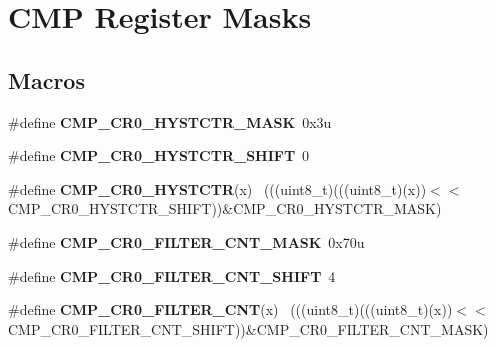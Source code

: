 \hypertarget{group___c_m_p___register___masks}{}\section{C\+M\+P Register Masks}
\label{group___c_m_p___register___masks}
\subsection*{Macros}
\begin{DoxyCompactItemize}
\item 
\hypertarget{group___c_m_p___register___masks_ga9a81a95d8ceda15abb107f3c961e2f03}{}\#define {\bfseries C\+M\+P\+\_\+\+C\+R0\+\_\+\+H\+Y\+S\+T\+C\+T\+R\+\_\+\+M\+A\+S\+K}~0x3u\label{group___c_m_p___register___masks_ga9a81a95d8ceda15abb107f3c961e2f03}

\item 
\hypertarget{group___c_m_p___register___masks_ga12a965eae39b79d9e6066de9af418df3}{}\#define {\bfseries C\+M\+P\+\_\+\+C\+R0\+\_\+\+H\+Y\+S\+T\+C\+T\+R\+\_\+\+S\+H\+I\+F\+T}~0\label{group___c_m_p___register___masks_ga12a965eae39b79d9e6066de9af418df3}

\item 
\hypertarget{group___c_m_p___register___masks_ga3ac2621a332671b38fa231e1fa14d26d}{}\#define {\bfseries C\+M\+P\+\_\+\+C\+R0\+\_\+\+H\+Y\+S\+T\+C\+T\+R}(x)                                          ~(((uint8\+\_\+t)(((uint8\+\_\+t)(x))$<$$<$C\+M\+P\+\_\+\+C\+R0\+\_\+\+H\+Y\+S\+T\+C\+T\+R\+\_\+\+S\+H\+I\+F\+T))\&C\+M\+P\+\_\+\+C\+R0\+\_\+\+H\+Y\+S\+T\+C\+T\+R\+\_\+\+M\+A\+S\+K)\label{group___c_m_p___register___masks_ga3ac2621a332671b38fa231e1fa14d26d}

\item 
\hypertarget{group___c_m_p___register___masks_gab1e98c122818fe880217f72fab932ac2}{}\#define {\bfseries C\+M\+P\+\_\+\+C\+R0\+\_\+\+F\+I\+L\+T\+E\+R\+\_\+\+C\+N\+T\+\_\+\+M\+A\+S\+K}~0x70u\label{group___c_m_p___register___masks_gab1e98c122818fe880217f72fab932ac2}

\item 
\hypertarget{group___c_m_p___register___masks_ga07a4d57ab7d44b55b3d73f612aa7dd98}{}\#define {\bfseries C\+M\+P\+\_\+\+C\+R0\+\_\+\+F\+I\+L\+T\+E\+R\+\_\+\+C\+N\+T\+\_\+\+S\+H\+I\+F\+T}~4\label{group___c_m_p___register___masks_ga07a4d57ab7d44b55b3d73f612aa7dd98}

\item 
\hypertarget{group___c_m_p___register___masks_gad9cbe394311ddbb43945fcdade409c9e}{}\#define {\bfseries C\+M\+P\+\_\+\+C\+R0\+\_\+\+F\+I\+L\+T\+E\+R\+\_\+\+C\+N\+T}(x)                                    ~(((uint8\+\_\+t)(((uint8\+\_\+t)(x))$<$$<$C\+M\+P\+\_\+\+C\+R0\+\_\+\+F\+I\+L\+T\+E\+R\+\_\+\+C\+N\+T\+\_\+\+S\+H\+I\+F\+T))\&C\+M\+P\+\_\+\+C\+R0\+\_\+\+F\+I\+L\+T\+E\+R\+\_\+\+C\+N\+T\+\_\+\+M\+A\+S\+K)\label{group___c_m_p___register___masks_gad9cbe394311ddbb43945fcdade409c9e}


\end{DoxyCompactItemize}
